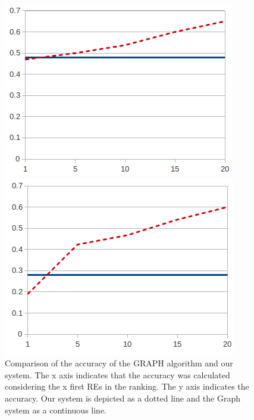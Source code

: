 \begin{figure}[ht]
\begin{minipage}{0.50\linewidth}
\centering
\includegraphics[width=\textwidth]{images/furniturePrec.png}
\end{minipage}
\begin{minipage}{0.50\linewidth}
\centering
\includegraphics[width=\textwidth]{images/precP.png}
\end{minipage}
\caption{Comparison of the accuracy of the GRAPH algorithm and our system. The x axis indicates that the accuracy was calculated considering the x first REs in the ranking. The y axis indicates the accuracy. Our system is depicted as a dotted line and the Graph system as a continuous line.\label{graficoPresicion}}
\end{figure}

